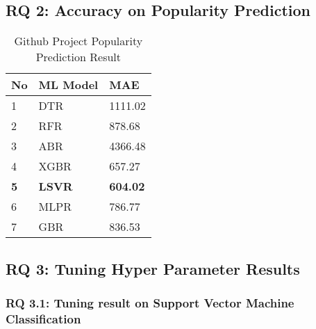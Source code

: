 \subsection{RQ 2: Accuracy on Popularity Prediction}

\begin{table}[]
\begin{tabular}{|l|l|l|}
\hline
{\color[HTML]{000000} \textbf{No}} & {\color[HTML]{000000} \textbf{ML Model}} & {\color[HTML]{000000} \textbf{MAE}}    \\ \hline
{\color[HTML]{000000} 1}           & {\color[HTML]{000000} DTR}               & {\color[HTML]{000000} 1111.02}         \\ \hline
{\color[HTML]{000000} 2}           & {\color[HTML]{000000} RFR}               & {\color[HTML]{000000} 878.68}          \\ \hline
{\color[HTML]{000000} 3}           & {\color[HTML]{000000} ABR}               & {\color[HTML]{000000} 4366.48}         \\ \hline
{\color[HTML]{000000} 4}           & {\color[HTML]{000000} XGBR}              & {\color[HTML]{000000} 657.27}          \\ \hline
{\color[HTML]{000000} \textbf{5}}  & {\color[HTML]{000000} \textbf{LSVR}}     & {\color[HTML]{000000} \textbf{604.02}} \\ \hline
{\color[HTML]{000000} 6}           & {\color[HTML]{000000} MLPR}              & {\color[HTML]{000000} 786.77}          \\ \hline
{\color[HTML]{000000} 7}           & {\color[HTML]{000000} GBR}               & {\color[HTML]{000000} 836.53}          \\ \hline
\end{tabular}
\label{tblRQ2}
\caption{Github Project Popularity Prediction Result}

\end{table}

\subsection{RQ 3: Tuning Hyper Parameter Results}
\subsubsection{RQ 3.1: Tuning result on Support Vector Machine Classification}

